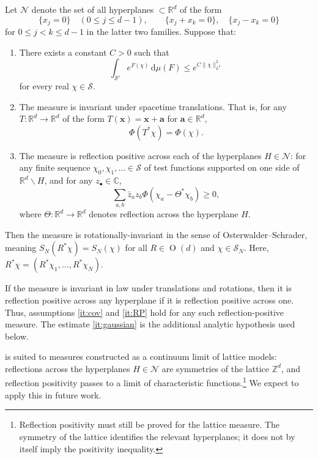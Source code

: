 \documentclass[11pt, letterpaper, reqno]{amsart}
\theoremstyle{definition}
\newenvironment{theorem}
{\pushQED{\qed}\renewcommand{\qedsymbol}{$\blacksquare\square$}\theoremxx}
{\popQED\endtheoremxx}
\theoremstyle{remark}
\newcommand{\bbC}{\mathbb{C}}
\newcommand{\bbR}{\mathbb{R}}
\newcommand{\bbZ}{\mathbb{Z}}
\newcommand{\calN}{\mathcal{N}}
\newcommand{\calS}{\mathcal{S}}
\newcommand{\bfa}{\mathbf{a}}
\newcommand{\bfx}{\mathbf{x}}
\newcommand{\dd}{\,\mathrm{d}}
\begin{document}
Let $\calN$ denote the set of all hyperplanes $\subset \bbR^d$ of the form 
\begin{equation}
    \{x_j=0\}\quad(0\leq j\leq d-1),\qquad \{x_j+x_k=0\},\quad \{x_j-x_k=0\}
\end{equation}
for $0\leq j<k\leq d-1$ in the latter two families. 
\begin{theorem} 
\label{thm:main}
Suppose that:
\begin{enumerate}[label=(\roman*)]
\item \label{it:gaussian} There exists a constant $C>0$ such that 
\begin{equation}\label{eq:gaussian}
    \int_{\calS'} e^{F(\chi)} \dd \mu(F) \leq e^{C \lVert \chi \rVert_{L^2}^2}
\end{equation}
for every real $\chi\in\calS$. 
\item  \label{it:cov}
The measure is invariant under spacetime translations. That is, for any $T:\bbR^d\to \bbR^d$ of the form $T(\bfx)=\bfx+\bfa$ for $\bfa\in \bbR^d$, 
\begin{equation}
    \Phi(T^* \chi) = \Phi(\chi). 
\end{equation}
\item The measure is reflection positive across each of the hyperplanes $H\in \calN$: for any finite sequence $\chi_0,\chi_1,\dots \in \calS$ of test functions supported on one side of $\bbR^d\backslash H$, and for any $z_\bullet\in \bbC$, 
\begin{equation}
    \sum_{a,b} \bar{z}_a z_b \Phi(\chi_a - \Theta^* \chi_b ) \geq 0,
\end{equation}
where $\Theta:\bbR^d\to\bbR^d$ denotes reflection across the hyperplane $H$. 
\label{it:RP}
\end{enumerate}
Then the measure is rotationally-invariant in the sense of Osterwalder--Schrader, meaning $S_N(R^* \chi) = S_N(\chi)$ for all $R\in \operatorname{O}(d)$ and $\chi\in \calS_N$. 
\end{theorem}
Here, $R^* \chi=(R^* \chi_1,\dots,R^* \chi_N)$. 


If the measure is invariant in law under translations and rotations, then it is reflection positive across any hyperplane if it is reflection positive across one. Thus, assumptions \ref{it:cov} and \ref{it:RP} hold for any such reflection-positive measure. The estimate \ref{it:gaussian} is the additional analytic hypothesis used below.


 is suited to measures constructed as a continuum limit of lattice models: reflections across the hyperplanes $H\in\calN$ are symmetries of the lattice $\bbZ^d$, and reflection positivity passes to a limit of characteristic functions.\footnote{Reflection positivity must still be proved for the lattice measure. The symmetry of the lattice identifies the relevant hyperplanes; it does not by itself imply the positivity inequality.} We expect to apply this in future work.
\end{document}
